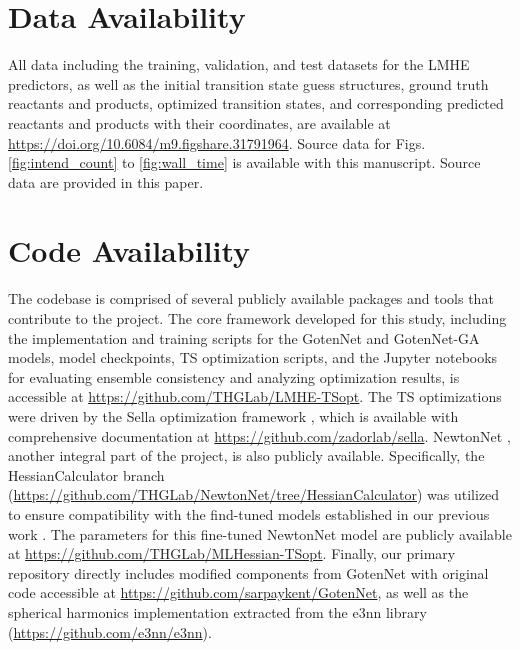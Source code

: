 \documentclass[12pt]{article}
\begin{document}



% 

\section*{Data Availability}
\noindent
All data \cite{data_avail} including the training, validation, and test datasets for the LMHE predictors, as well as the initial transition state guess structures, ground truth reactants and products, optimized transition states, and corresponding predicted reactants and products with their coordinates, are available at \url{https://doi.org/10.6084/m9.figshare.31791964}. Source data for Figs. \ref{fig:intend_count} to \ref{fig:wall_time} is available with this manuscript. Source data are provided in this paper. 

\section*{Code Availability}
\noindent
The codebase is comprised of several publicly available packages and tools that contribute to the project. The core framework developed for this study, including the implementation and training scripts for the GotenNet and GotenNet-GA models, model checkpoints, TS optimization scripts, and the Jupyter notebooks for evaluating ensemble consistency and analyzing optimization results, is accessible at \url{https://github.com/THGLab/LMHE-TSopt}. The TS optimizations were driven by the Sella optimization framework \cite{Sella2}, which is available with comprehensive documentation at \url{https://github.com/zadorlab/sella}. NewtonNet \cite{NewtonNet}, another integral part of the project, is also publicly available. Specifically, the HessianCalculator branch (\url{https://github.com/THGLab/NewtonNet/tree/HessianCalculator}) was utilized to ensure compatibility with the find-tuned models established in our previous work \cite{Yuan2024}. The parameters for this fine-tuned NewtonNet model \cite{Yuan2024} are publicly available at \url{https://github.com/THGLab/MLHessian-TSopt}. Finally,  our primary repository directly includes modified components from GotenNet \cite{GotenNet} with original code accessible at \url{https://github.com/sarpaykent/GotenNet}, as well as the spherical harmonics implementation extracted from the e3nn library \cite{e3nn} (\url{https://github.com/e3nn/e3nn}).
\end{document}
